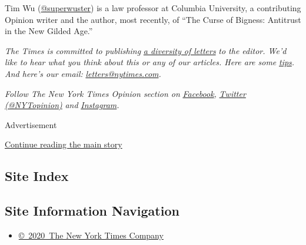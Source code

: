 Tim Wu (\href{https://twitter.com/superwuster}{@superwuster}) is a law
professor at Columbia University, a contributing Opinion writer and the
author, most recently, of ``The Curse of Bigness: Antitrust in the New
Gilded Age.''

\emph{The Times is committed to publishing}
\href{https://www.nytimes.com/2019/01/31/opinion/letters/letters-to-editor-new-york-times-women.html}{\emph{a
diversity of letters}} \emph{to the editor. We'd like to hear what you
think about this or any of our articles. Here are some}
\href{https://help.nytimes.com/hc/en-us/articles/115014925288-How-to-submit-a-letter-to-the-editor}{\emph{tips}}\emph{.
And here's our email:}
\href{mailto:letters@nytimes.com}{\emph{letters@nytimes.com}}\emph{.}

\emph{Follow The New York Times Opinion section on}
\href{https://www.facebook.com/nytopinion}{\emph{Facebook}}\emph{,}
\href{http://twitter.com/NYTOpinion}{\emph{Twitter (@NYTopinion)}}
\emph{and}
\href{https://www.instagram.com/nytopinion/}{\emph{Instagram}}\emph{.}

Advertisement

\protect\hyperlink{after-bottom}{Continue reading the main story}

\hypertarget{site-index}{%
\subsection{Site Index}\label{site-index}}

\hypertarget{site-information-navigation}{%
\subsection{Site Information
Navigation}\label{site-information-navigation}}

\begin{itemize}
\tightlist
\item
  \href{https://help.nytimes.com/hc/en-us/articles/115014792127-Copyright-notice}{©~2020~The
  New York Times Company}
\end{itemize}

